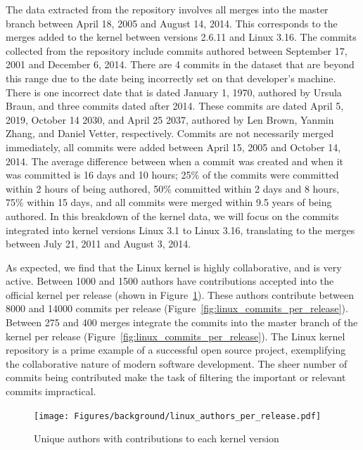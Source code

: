 The data extracted from the repository involves all merges into the
master branch between April 18, 2005 and August 14, 2014. This
corresponds to the merges added to the kernel between versions 2.6.11
and Linux 3.16. The commits collected from the repository include
commits authored between September 17, 2001 and December 6, 2014. There
are 4 commits in the dataset that are beyond this range due to the date
being incorrectly set on that developer's machine. There is one
incorrect date that is dated January 1, 1970, authored by Ursula Braun,
and three commits dated after 2014. These commits are dated April 5,
2019, October 14 2030, and April 25 2037, authored by Len Brown, Yanmin
Zhang, and Daniel Vetter, respectively. Commits are not necessarily
merged immediately, all commits were added between April 15, 2005 and
October 14, 2014. The average difference between when a commit was
created and when it was committed is 16 days and 10 hours; 25\% of the
commits were committed within 2 hours of being authored, 50\% committed
within 2 days and 8 hours, 75\% within 15 days, and all commits were
merged within 9.5 years of being authored. In this breakdown of the
kernel data, we will focus on the commits integrated into kernel
versions Linux 3.1 to Linux 3.16, translating to the merges between July
21, 2011 and August 3, 2014.


As expected, we find that the Linux kernel is highly collaborative, and
is very active. Between 1000 and 1500 authors have contributions
accepted into the official kernel per release (shown in
Figure~\ref{fig:linux_authors_per_release}). These authors contribute
between 8000 and 14000 commits per release
(Figure~\ref{fig:linux_commits_per_release}). Between 275 and 400 merges
integrate the commits into the master branch of the kernel per release
(Figure~\ref{fig:linux_commits_per_release}). The Linux kernel
repository is a prime example of a successful open source project,
exemplifying the collaborative nature of modern software development.
The sheer number of commits being contributed make the task of filtering
the important or relevant commits impractical.


\begin{figure}[htpb]
  \centering
  \texttt{[image: Figures/background/linux\_authors\_per\_release.pdf]}
  \caption{Unique authors with contributions to each kernel version}
  \label{fig:linux_authors_per_release}
\end{figure}

